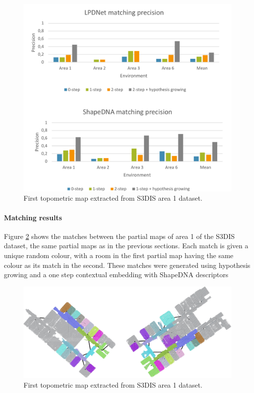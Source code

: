 \begin{figure}[h]
    \centering
    \includegraphics*[width=\textwidth]{./fig/match_charts.pdf}
    \caption{First topometric map extracted from S3DIS area 1 dataset.}
    \label{fig:lpdnet_match}
\end{figure}




\paragraph{Matching results}
Figure \ref{fig:area_1_match} shows the matches between the partial maps of area 1 of the S3DIS dataset, the same partial maps as in the previous sections. Each match is given a unique random colour, with a room in the first partial map having the same colour as its match in the second. These matches were generated using hypothesis growing and a one step contextual embedding with ShapeDNA descriptors


\begin{figure}[h]
    \centering
    \includegraphics*[width=\textwidth]{./fig/area_1_match.pdf}
    \caption{First topometric map extracted from S3DIS area 1 dataset.}
    \label{fig:area_1_match}
\end{figure}

